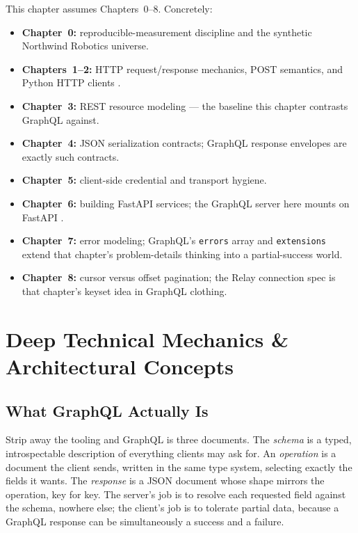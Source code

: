 This chapter assumes Chapters~0--8. Concretely:

\begin{itemize}
  \item \textbf{Chapter~0:} reproducible-measurement discipline and the
        synthetic Northwind Robotics universe.
  \item \textbf{Chapters~1--2:} HTTP request/response mechanics, POST
        semantics, and Python HTTP clients \cite{rfc9110,httpxdocs}.
  \item \textbf{Chapter~3:} REST resource modeling --- the baseline this
        chapter contrasts GraphQL against.
  \item \textbf{Chapter~4:} JSON serialization contracts; GraphQL response
        envelopes are exactly such contracts.
  \item \textbf{Chapter~5:} client-side credential and transport hygiene.
  \item \textbf{Chapter~6:} building FastAPI services; the GraphQL server
        here mounts on FastAPI \cite{fastapidocs}.
  \item \textbf{Chapter~7:} error modeling; GraphQL's
        \texttt{errors} array and \texttt{extensions} extend that chapter's
        problem-details thinking into a partial-success world.
  \item \textbf{Chapter~8:} cursor versus offset pagination; the Relay
        connection spec is that chapter's keyset idea in GraphQL clothing.
\end{itemize}

\section{Deep Technical Mechanics \& Architectural Concepts}
\label{sec:ch12-mechanics}

\subsection{What GraphQL Actually Is}

Strip away the tooling and GraphQL is three documents. The \emph{schema}
is a typed, introspectable description of everything clients may ask for.
An \emph{operation} is a document the client sends, written in the same
type system, selecting exactly the fields it wants. The \emph{response}
is a JSON document whose shape mirrors the operation, key for key. The
server's job is to resolve each requested field against the schema,
nowhere else; the client's job is to tolerate partial data, because a
GraphQL response can be simultaneously a success and a failure.

